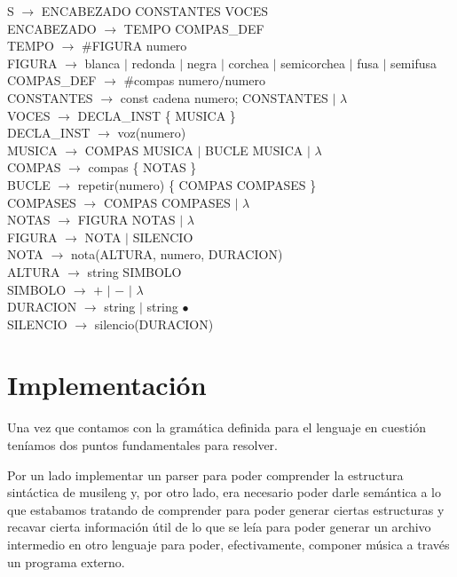 S $\rightarrow$ ENCABEZADO CONSTANTES VOCES \\
ENCABEZADO $\rightarrow$ TEMPO COMPAS\_DEF \\
TEMPO $\rightarrow$ \#FIGURA numero \\
FIGURA $\rightarrow$ blanca $\mid$ redonda $\mid$ negra $\mid$ corchea $\mid$ semicorchea $\mid$ fusa $\mid$ semifusa \\
COMPAS\_DEF $\rightarrow$ \#compas numero$/$numero  \\
CONSTANTES $\rightarrow$ const cadena numero; CONSTANTES $\mid$ $\lambda$ \\
VOCES $\rightarrow$ DECLA\_INST \{ MUSICA \} \\
DECLA\_INST $\rightarrow$ voz(numero) \\
MUSICA $\rightarrow$ COMPAS MUSICA $\mid$ BUCLE MUSICA $\mid$ $\lambda$ \\
COMPAS $\rightarrow$ compas \{ NOTAS \} \\
BUCLE $\rightarrow$ repetir(numero) \{ COMPAS COMPASES \} \\
COMPASES $\rightarrow$ COMPAS COMPASES $\mid$ $\lambda$ \\
NOTAS $\rightarrow$ FIGURA NOTAS $\mid$ $\lambda$ \\
FIGURA $\rightarrow$ NOTA $\mid$ SILENCIO \\
NOTA $\rightarrow$ nota(ALTURA, numero, DURACION) \\
ALTURA $\rightarrow$ string SIMBOLO \\
SIMBOLO $\rightarrow$ $+$ $\mid$ $-$ $\mid$ $\lambda$ \\
DURACION $\rightarrow$ string $\mid$ string $\bullet$ \\
SILENCIO $\rightarrow$ silencio(DURACION) \\



\section{Implementación}

Una vez que contamos con la gramática definida para el lenguaje en cuestión teníamos dos puntos fundamentales para resolver. 

Por un lado implementar un parser para poder comprender la estructura sintáctica de musileng y, por otro lado, 
era necesario poder darle semántica a lo que estabamos tratando de comprender para poder generar ciertas estructuras y recavar 
cierta información útil de lo que se leía para poder generar un archivo intermedio en otro lenguaje para poder, efectivamente,
componer música a través un programa externo.

